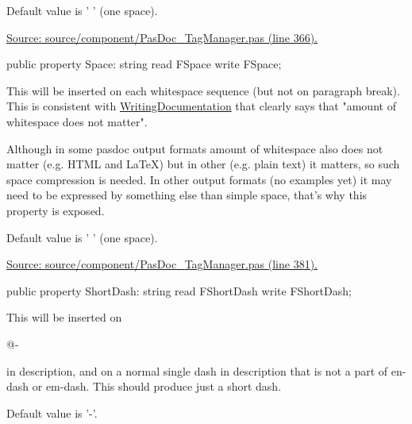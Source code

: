 \documentclass{report}
\newif\ifpdf
\begin{document}
\begin{list}{}
Default value is ' ' (one space).\par
\href{https://github.com/pasdoc/pasdoc/blob/master/source/component/PasDoc_TagManager.pas#L366}{Source: source/component/PasDoc{\_}TagManager.pas (line 366).}\label{PasDoc_TagManager.TTagManager-Space}
\item[\textbf{Space}\hfill]
\ifpdf
\begin{flushleft}
\fi
\begin{ttfamily}
public property Space: string read FSpace write FSpace;\end{ttfamily}

\ifpdf
\end{flushleft}
\fi


\par This will be inserted on each whitespace sequence (but not on paragraph break). This is consistent with \href{https://pasdoc.github.io/WritingDocumentation}{WritingDocumentation} that clearly says that "amount of whitespace does not matter".

Although in some pasdoc output formats amount of whitespace also does not matter (e.g. HTML and LaTeX) but in other (e.g. plain text) it matters, so such space compression is needed. In other output formats (no examples yet) it may need to be expressed by something else than simple space, that's why this property is exposed.

Default value is ' ' (one space).\par
\href{https://github.com/pasdoc/pasdoc/blob/master/source/component/PasDoc_TagManager.pas#L381}{Source: source/component/PasDoc{\_}TagManager.pas (line 381).}\label{PasDoc_TagManager.TTagManager-ShortDash}
\item[\textbf{ShortDash}\hfill]
\ifpdf
\begin{flushleft}
\fi
\begin{ttfamily}
public property ShortDash: string read FShortDash write FShortDash;\end{ttfamily}

\ifpdf
\end{flushleft}
\fi


\par This will be inserted on \begin{ttfamily}@{-}\end{ttfamily} in description, and on a normal single dash in description that is not a part of en{-}dash or em{-}dash. This should produce just a short dash.

Default value is '{-}'.


\end{list}
\end{document}
